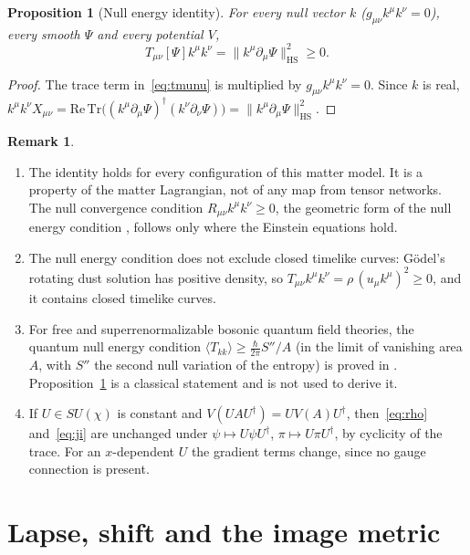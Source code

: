 \documentclass[11pt,a4paper,reqno]{amsart}
\newtheorem{proposition}[theorem]{Proposition}
\theoremstyle{definition}
\newtheorem{remark}[theorem]{Remark}
\numberwithin{equation}{section}
\newcommand{\Tr}{\mathrm{Tr}}
\newcommand{\HS}{\mathrm{HS}}
\begin{document}
\begin{proposition}[Null energy identity]\label{prop:nec}
For every null vector $k$ ($g_{\mu\nu}k^\mu k^\nu=0$), every smooth $\Psi$ and every potential $V$,
\[
T_{\mu\nu}[\Psi]k^\mu k^\nu=\big\|k^\mu\partial_\mu\Psi\big\|_{\HS}^2\ge0 .
\]
\end{proposition}

\begin{proof}
The trace term in~\eqref{eq:tmunu} is multiplied by $g_{\mu\nu}k^\mu k^\nu=0$. Since $k$ is real, $k^\mu k^\nu X_{\mu\nu}=\mathrm{Re}\,\Tr\big((k^\mu\partial_\mu\Psi)^\dagger(k^\nu\partial_\nu\Psi)\big)=\|k^\mu\partial_\mu\Psi\|_{\HS}^2$.
\end{proof}

\begin{remark}\label{rem:nec}
\begin{enumerate}[label=(\alph*)]
    \item The identity holds for every configuration of this matter model. It is a property of the matter Lagrangian, not of any map from tensor networks. The null convergence condition $R_{\mu\nu}k^\mu k^\nu\ge0$, the geometric form of the null energy condition \cite[Sec.~2.1]{curiel2017}, follows only where the Einstein equations hold.
    \item The null energy condition does not exclude closed timelike curves: G\"odel's rotating dust solution \cite{godel1949} has positive density, so $T_{\mu\nu}k^\mu k^\nu=\rho\,(u_\mu k^\mu)^2\ge0$, and it contains closed timelike curves.
    \item For free and superrenormalizable bosonic quantum field theories, the quantum null energy condition $\langle T_{kk}\rangle\ge\frac{\hbar}{2\pi}S''/A$ (in the limit of vanishing area $A$, with $S''$ the second null variation of the entropy) is proved in \cite{bousso2016}. Proposition~\ref{prop:nec} is a classical statement and is not used to derive it.
    \item If $U\in SU(\chi)$ is constant and $V(UAU^\dagger)=UV(A)U^\dagger$, then~\eqref{eq:rho} and~\eqref{eq:ji} are unchanged under $\psi\mapsto U\psi U^\dagger$, $\pi\mapsto U\pi U^\dagger$, by cyclicity of the trace. For an $x$-dependent $U$ the gradient terms change, since no gauge connection is present.
\end{enumerate}
\end{remark}

\section{Lapse, shift and the image metric}
\label{sec:lapse}
\end{document}
